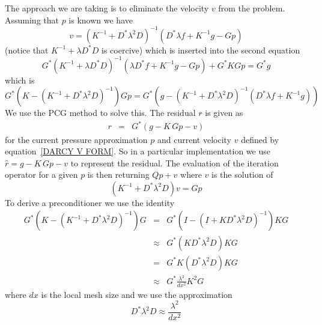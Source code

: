 The approach we are taking is to eliminate the velocity $v$ from the problem. Assuming that $p$ is known we have
\begin{equation}\label{DARCY V FORM}
v= (K^{-1}+ D^*\lambda^2 D)^{-1} ( D^*\lambda f + K^{-1} g - Gp)
\end{equation} 
(notice that $K^{-1}+\lambda D^*D$ is coercive) which is inserted into the second equation
\begin{equation}
G^* (K^{-1}+\lambda D^*D)^{-1} (\lambda D^*f + K^{-1} g - Gp) + G^* KG p = G^*g 
\end{equation} 
which is 
\begin{equation}
G^* ( K - (K^{-1}+ D^*\lambda^2 D)^{-1} ) G p = G^* (g-(K^{-1}+D^*\lambda^2 D)^{-1} ( D^*\lambda f + K^{-1} g) ) 
\end{equation} 
We use the PCG  method to solve this.
The residual $r$  is given as
\begin{equation}
\begin{array}{rcl}
r & =&  G^* \left( g - K\, G p - v \right)
\end{array}
\end{equation} 
for the current pressure approximation $p$ and current velocity $v$ defined by  
equation~\ref{DARCY V FORM}.
So in a particular implementation we use $\hat{r}=g-K\, Gp-v$ to represent the residual. 
The evaluation of the iteration operator for a given $p$ is then 
returning $Qp+v$ where $v$ is the solution of 
\begin{equation}\label{UPDATE W}
(K^{-1}+ D^*\lambda^2 D)v = Gp
\end{equation}
To derive a preconditioner we use the identity
\begin{equation}
 \begin{array}{rcl}

G^* ( K - (K^{-1}+ D^*\lambda^2 D)^{-1} ) G  & = & G^* (I - (I + K D^*\lambda^2 D)^{-1}) K G \\
                               & \approx &  G^* (K D^*\lambda^2 D) K G  \\
			       & =  & G^*  K ( D^*  \lambda^2 D) K G \\
			       & \approx  & G^* \frac{\lambda^2}{dx^2} K^2 G
\end{array}
\end{equation} 
where $dx$ is the local mesh size and we use the approximation
\begin{equation}
D^*  \lambda^2 D \approx \frac{\lambda^2}{dx^2}
\end{equation} 
